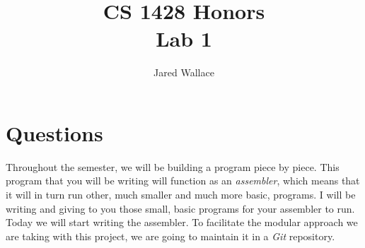 \documentclass[letterpaper,12pt]{article}
\title{\Large CS 1428 Honors\\Lab 1}
\author{Jared Wallace}
\date{}
\begin{document}
\maketitle

\vspace{30mm}

\section*{Questions}
Throughout the semester, we will be building a program piece by piece.
This program that you will be writing will function as an \emph{assembler},
which means that it will in turn run other, much smaller and much more basic, programs.
I will be writing and giving to you those small, basic programs for your assembler to run.
Today we will start writing the assembler. To facilitate the modular approach we are taking with
this project, we are going to maintain it in a \emph{Git} repository.
\end{document}
